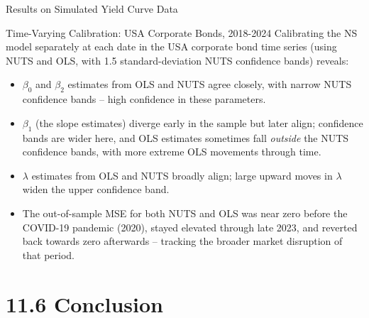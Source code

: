 \documentclass[aspectratio=169,10pt]{beamer}
\begin{document}
\begin{frame}[allowframebreaks]{Results on Simulated Yield Curve Data}
\begin{alertblock}{Time-Varying Calibration: USA Corporate Bonds, 2018-2024}
  Calibrating the NS model separately at each date in the USA corporate
  bond time series (using NUTS and OLS, with 1.5 standard-deviation NUTS
  confidence bands) reveals:
  \begin{itemize}
    \item $\beta_0$ and $\beta_2$ estimates from OLS and NUTS agree
      closely, with narrow NUTS confidence bands -- high confidence in
      these parameters.
    \item $\beta_1$ (the slope estimates) diverge early in the sample but
      later align; confidence bands are wider here, and OLS estimates
      sometimes fall \emph{outside} the NUTS confidence bands, with more
      extreme OLS movements through time.
    \item $\lambda$ estimates from OLS and NUTS broadly align; large
      upward moves in $\lambda$ widen the upper confidence band.
    \item The out-of-sample MSE for both NUTS and OLS was near zero before
      the COVID-19 pandemic (2020), stayed elevated through late 2023, and
      reverted back towards zero afterwards -- tracking the broader
      market disruption of that period.
  \end{itemize}
\end{alertblock}

\end{frame}

\section{11.6 Conclusion}
\end{document}
